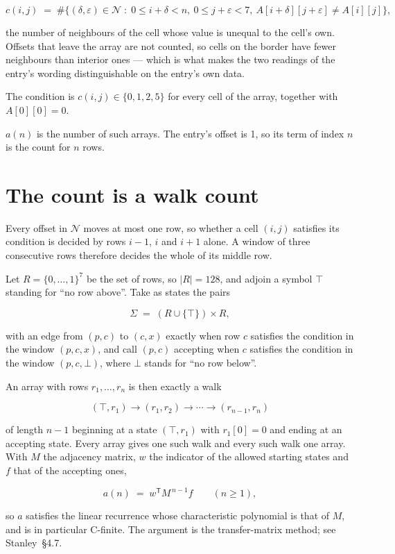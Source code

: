 \documentclass[11pt]{article}
\theoremstyle{definition}
\begin{document}
\[c(i,j) \;=\; \#\bigl\{(\delta,\varepsilon)\in\mathcal{N} \;:\; 0\le i+\delta<n,\ 0\le j+\varepsilon<7,\ A[i+\delta][j+\varepsilon] \neq A[i][j]\bigr\},\]

the number of neighbours of the cell whose value is unequal to the cell's own. Offsets that leave the array are not counted, so cells on the border have fewer neighbours than interior ones --- which is what makes the two readings of the entry's wording distinguishable on the entry's own data.

The condition is $c(i,j) \in \{0, 1, 2, 5\}$ for every cell of the array, together with $A[0][0]=0$.

$a(n)$ is the number of such arrays. The entry's offset is 1, so its term of index $n$ is the count for $n$ rows.

\section{The count is a walk count}

Every offset in $\mathcal{N}$ moves at most one row, so whether a cell $(i,j)$ satisfies its condition is decided by rows $i-1$, $i$ and $i+1$ alone. A window of three consecutive rows therefore decides the whole of its middle row.

Let $R = \{0,\dots,1\}^{7}$ be the set of rows, so $|R| = 128$, and adjoin a symbol $\top$ standing for ``no row above''. Take as states the pairs

\[\Sigma \;=\; (R \cup \{\top\}) \times R,\]

with an edge from $(p,c)$ to $(c,x)$ exactly when row $c$ satisfies the condition in the window $(p,c,x)$, and call $(p,c)$ accepting when $c$ satisfies the condition in the window $(p,c,\bot)$, where $\bot$ stands for ``no row below''.

An array with rows $r_1,\dots,r_n$ is then exactly a walk

\[(\top,r_1) \to (r_1,r_2) \to \cdots \to (r_{n-1},r_n)\]

of length $n-1$ beginning at a state $(\top,r_1)$ with $r_1[0]=0$ and ending at an accepting state. Every array gives one such walk and every such walk one array. With $M$ the adjacency matrix, $w$ the indicator of the allowed starting states and $f$ that of the accepting ones,

\[a(n) \;=\; w^{\mathsf T} M^{\,n-1} f \qquad (n \ge 1),\]

so $a$ satisfies the linear recurrence whose characteristic polynomial is that of $M$, and is in particular C-finite. The argument is the transfer-matrix method; see Stanley~\S4.7.
\end{document}
